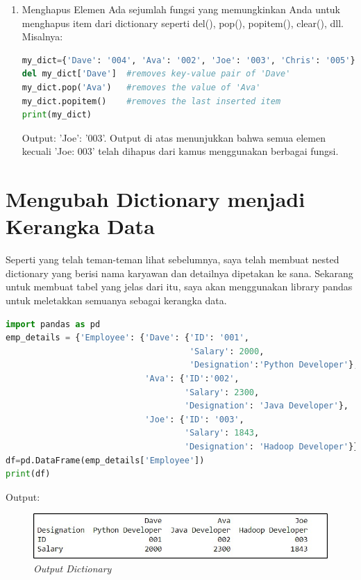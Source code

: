 \begin{enumerate}
Dictionary adalah tipe data yang bisa berubah dan oleh karena itu, teman-teman dapat memperbaruinya jika diperlukan. Misalnya, jika saya ingin mengubah ID karyawan bernama Dave dari '001' menjadi '004' dan jika saya ingin menambahkan pasangan nilai kunci lain ke kamus saya, saya dapat melakukan hal berikut:
\begin{lstlisting}[language=Python, caption=Dict For Loop]
my_dict={'Dave' : '001' , 'Ava': '002' , 'Joe': '003'}
my_dict['Dave'] = '004'   #Updating the value of Dave
my_dict['Chris'] = '005'  #adding a key-value pair
print(my_dict)
\end{lstlisting}
Output:
\begin{lstlisting}
{'Dave': '004', 'Ava': '002', 'Joe': '003', 'Chris': '005'}
\end{lstlisting}
\item Menghapus Elemen
Ada sejumlah fungsi yang memungkinkan Anda untuk menghapus item dari dictionary seperti del(), pop(), popitem(), clear(), dll. Misalnya:
\begin{lstlisting}[language=Python, caption=Dict For Loop]
my_dict={'Dave': '004', 'Ava': '002', 'Joe': '003', 'Chris': '005'}
del my_dict['Dave']  #removes key-value pair of 'Dave'
my_dict.pop('Ava')   #removes the value of 'Ava'
my_dict.popitem()    #removes the last inserted item
print(my_dict)
\end{lstlisting}
Output: {'Joe': '003'}. Output di atas menunjukkan bahwa semua elemen kecuali 'Joe: 003' telah dihapus dari kamus menggunakan berbagai fungsi.
\end{enumerate}

\section{Mengubah Dictionary menjadi Kerangka Data}
Seperti yang telah teman-teman lihat sebelumnya, saya telah membuat nested dictionary yang berisi nama karyawan dan detailnya dipetakan ke sana. Sekarang untuk membuat tabel yang jelas dari itu, saya akan menggunakan library pandas untuk meletakkan semuanya sebagai kerangka data.
\begin{lstlisting}[language=Python, caption=Mengubah Dictionary menjadi Kerangka Data]
import pandas as pd
emp_details = {'Employee': {'Dave': {'ID': '001',
                                     'Salary': 2000,
                                     'Designation':'Python Developer'},
                            'Ava': {'ID':'002',
                                    'Salary': 2300,
                                    'Designation': 'Java Developer'},
                            'Joe': {'ID': '003',
                                    'Salary': 1843,
                                    'Designation': 'Hadoop Developer'}}}
df=pd.DataFrame(emp_details['Employee'])
print(df)
\end{lstlisting}

Output:
\begin{figure}[H]
    \centering
    \includegraphics[scale=0.3]{figures/hash-map/output}
    \caption{\textit{Output Dictionary}}
    \label{colab6}
\end{figure}